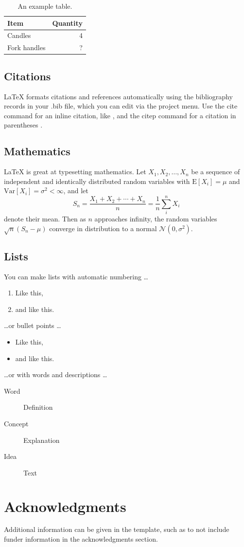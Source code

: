 \documentclass{finefocus}
\begin{document}
\begin{table}[ht]
\centering
\begin{tabular}{l|r}
Item & Quantity \\\hline
Candles & 4 \\
Fork handles & ?  
\end{tabular}
\caption{\label{tab:widgets}An example table.}
\end{table}

\subsection{Citations}

LaTeX formats citations and references automatically using the bibliography records in your .bib file, which you can edit via the project menu. Use the cite command for an inline citation, like \cite{lees2010theoretical}, and the citep command for a citation in parentheses \citep{lees2010theoretical}.

\subsection{Mathematics}

\LaTeX{} is great at typesetting mathematics. Let $X_1, X_2, \ldots, X_n$ be a sequence of independent and identically distributed random variables with $\text{E}[X_i] = \mu$ and $\text{Var}[X_i] = \sigma^2 < \infty$, and let
$$S_n = \frac{X_1 + X_2 + \cdots + X_n}{n}
      = \frac{1}{n}\sum_{i}^{n} X_i$$
denote their mean. Then as $n$ approaches infinity, the random variables $\sqrt{n}(S_n - \mu)$ converge in distribution to a normal $\mathcal{N}(0, \sigma^2)$.

\subsection{Lists}

You can make lists with automatic numbering \dots

\begin{enumerate}
\item Like this,
\item and like this.
\end{enumerate}
\dots or bullet points \dots
\begin{itemize}[noitemsep] 
\item Like this,
\item and like this.
\end{itemize}
\dots or with words and descriptions \dots
\begin{description}
\item[Word] Definition
\item[Concept] Explanation
\item[Idea] Text
\end{description}

\section{Acknowledgments}

Additional information can be given in the template, such as to not include funder information in the acknowledgments section.


\end{document}
